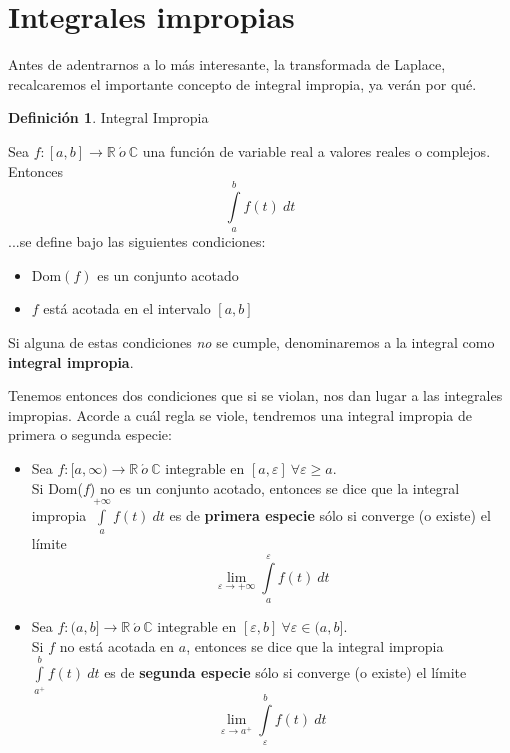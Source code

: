 \documentclass[12pt]{article}
\theoremstyle{definition}
\newtheorem{definition}{Definici\'on}[section]
\theoremstyle{theorem}
\theoremstyle{corolary}
\theoremstyle{method}
\begin{document}
\section{Integrales impropias}
Antes de adentrarnos a lo m\'as interesante, la transformada de Laplace, recalcaremos el importante concepto de integral impropia, ya ver\'an por qu\'e.\\

\colorbox{violet!40!white!80}{\parbox{\linewidth}{
\theoremstyle{definition}
\begin{definition}{Integral Impropia}

Sea $f:[a,b]\to \mathbb{R}\ \acute{o}\ \mathbb{C}$ una funci\'on de variable real a valores reales o complejos. Entonces $$\int\limits_a^b f(t)\ dt$$ ...se define bajo las siguientes condiciones:

\begin{itemize}
	\item $\mbox{Dom}(f)$ es un conjunto acotado
	\item $f$ est\'a acotada en el intervalo $[a,b]$
\end{itemize}

Si alguna de estas condiciones \textit{no} se cumple, denominaremos a la integral como \textbf{integral impropia}.

\end{definition}}}
\linebreak
\linebreak

Tenemos entonces dos condiciones que si se violan, nos dan lugar a las integrales impropias. Acorde a cu\'al regla se viole, tendremos una integral impropia de primera o segunda especie:

\begin{itemize}
	\item Sea $f:[a, \infty) \to \mathbb{R}\ \acute{o} \ \mathbb{C}$ integrable en $[a,\varepsilon]\ \forall\varepsilon \geq a $.\\
	Si {\color{red} Dom($f$) no es un conjunto acotado}, entonces se dice que la integral impropia  $\int\limits_a^{+\infty}f(t)\ dt$ es de \textbf{primera especie} s\'olo si converge (o existe) el l\'imite $$\lim\limits_{\varepsilon\to +\infty} \int\limits_a^{\varepsilon}f(t)\ dt$$
	\item Sea $f:(a,b] \to \mathbb{R}\ \acute{o} \ \mathbb{C}$ integrable en $[\varepsilon,b]\ \forall\varepsilon\in (a,b]$.\\
	Si {\color{red} $f$ no est\'a acotada en $a$}, entonces se dice que la integral impropia  $\int\limits_{a^+}^b f(t)\ dt$ es de \textbf{segunda especie} s\'olo si converge (o existe) el l\'imite $$\lim\limits_{\varepsilon\to a^+} \int\limits_{\varepsilon}^b f(t)\ dt$$
	
\end{itemize}
\end{document}
